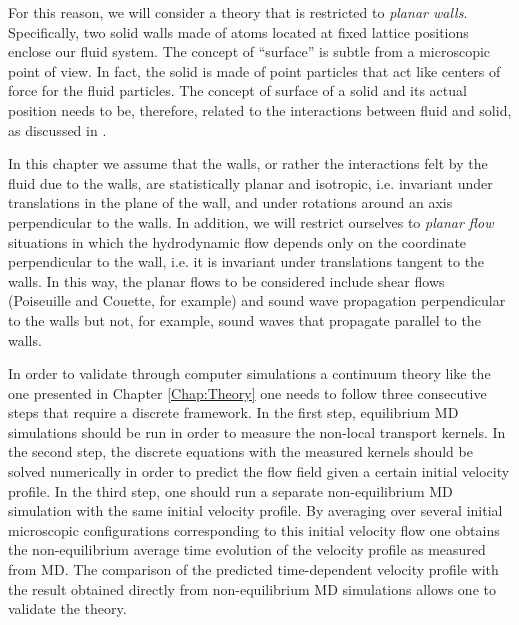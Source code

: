\documentclass[b5paper,openright,11pt]{book}
\begin{document}
For  this reason,  we will  consider a  theory that  is restricted  to
\textit{planar walls}. Specifically, two solid walls made of atoms located at fixed lattice positions enclose our fluid system. The concept of  ``surface'' is subtle  from a
microscopic  point of  view.   In fact,  the solid  is  made of  point
particles that act like centers of  force for the fluid particles. The
concept of  surface of a  solid and its  actual position needs  to be,
therefore, related  to the  interactions between  fluid and  solid, as
discussed in \cite{CamargoBC2018}.

In this chapter we assume that the walls, or rather the interactions felt
by the fluid due to the  walls, are statistically planar and isotropic,
i.e.  invariant under translations in the plane of the wall, and under
rotations around an axis perpendicular to the walls.
In  addition,  we  will  restrict ourselves  to  \textit{planar  flow}
situations  in  which  the  hydrodynamic  flow  depends  only  on  the
coordinate  perpendicular to  the wall,  i.e.  it  is invariant  under
translations tangent to the walls.
In  this way,  the planar  flows  to be considered
include shear  flows (Poiseuille and  Couette, for example)  and sound
wave  propagation perpendicular  to the  walls but  not, for  example,
sound waves that propagate parallel to the walls.

In order to  validate through computer simulations  a continuum theory
like the one presented in Chapter  \ref{Chap:Theory} one needs to follow
three consecutive  steps that  require a  discrete framework.   In the
first  step, equilibrium  MD simulations  should  be run  in order  to
measure  the non-local  transport kernels.   In the  second step,  the
discrete  equations  with  the   measured  kernels  should  be  solved
numerically in order to predict the flow field given a certain initial
velocity  profile.  In  the  third  step, one  should  run a  separate
non-equilibrium MD simulation with  the same initial velocity profile.
By   averaging  over   several   initial  microscopic   configurations
corresponding  to   this  initial   velocity  flow  one   obtains  the
non-equilibrium  average time  evolution  of the  velocity profile  as
measured  from MD.   The  comparison of  the predicted  time-dependent
velocity   profile   with   the    result   obtained   directly   from
non-equilibrium MD simulations allows one to validate the theory.
\end{document}
